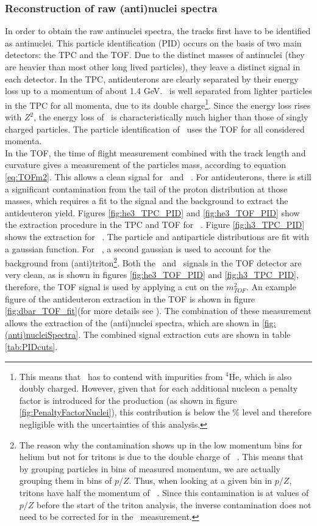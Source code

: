 \subsubsection{Reconstruction of raw (anti)nuclei spectra}\label{sec:Meth:PIDandSelections}
In order to obtain the raw antinuclei spectra, the tracks first have to be identified as antinuclei. This particle identification (PID) occurs on the basis of two main detectors: the TPC and the TOF. Due to the distinct masses of antinuclei (they are heavier than most other long lived particles), they leave a distinct signal in each detector. In the TPC, antideuterons are clearly separated by their energy loss up to a momentum of about 1.4 GeV. \ahe\ is well separated from lighter particles in the TPC for all momenta, due to its double charge\footnote{This means that \ahe\ has to contend with impurities from $^4\overline{\mathrm{He}}$, which is also doubly charged. However, given that for each additional nucleon a penalty factor is introduced for the production (as shown in figure \ref{fig:PenaltyFactorNuclei}), this contribution is below the \% level and therefore negligible with the uncertainties of this analysis.}. Since the energy loss rises with $Z^2$, the energy loss of \ahe\ is characteristically much higher than those of singly charged particles. The particle identification of \atrit\ uses the TOF for all considered momenta.\\
In the TOF, the time of flight measurement combined with the track length and curvature gives a measurement of the particles mass, according to equation \ref{eq:TOFm2}. This allows a clean signal for \atrit\ and \ahe\ . For antideuterons, there is still a significant contamination from the tail of the proton distribution at those masses, which requires a fit to the signal and the background to extract the antideuteron yield. Figures \ref{fig:he3_TPC_PID} and \ref{fig:he3_TOF_PID} show the extraction procedure in the TPC and TOF for \ahe\ . Figure \ref{fig:h3_TPC_PID} shows the extraction for \atrit\ . The particle and antiparticle distributions are fit with a gaussian function. For \ahe\ , a second gaussian is used to account for the background from (anti)triton\footnote{The reason why the contamination shows up in the low momentum bins for helium but not for tritons is due to the double charge of \ahe\ . This means that by grouping particles in bins of measured momentum, we are actually grouping them in bins of $p/Z$. Thus, when looking at a given bin in $p/Z$, tritons have half the momentum of \ahe\ . Since this contamination is at values of $p/Z$ before the start of the triton analysis, the inverse contamination does not need to be corrected for in the \atrit\ measurement. }. Both the \ahe\ and \atrit\  signals in the TOF detector are very clean, as is shown in figures \ref{fig:he3_TOF_PID} and \ref{fig:h3_TPC_PID}, therefore, the TOF signal is used by applying a cut on the $m_{TOF}^2$. An example figure of the antideuteron extraction in the TOF is shown in figure \ref{fig:dbar_TOF_fit}(for more details see \cite{dbar_ann}). The combination of these measurement allows the extraction of the (anti)nuclei spectra, which are shown in \ref{fig:(anti)nucleiSpectra}. The combined signal extraction cuts are shown in table \ref{tab:PIDcuts}.
